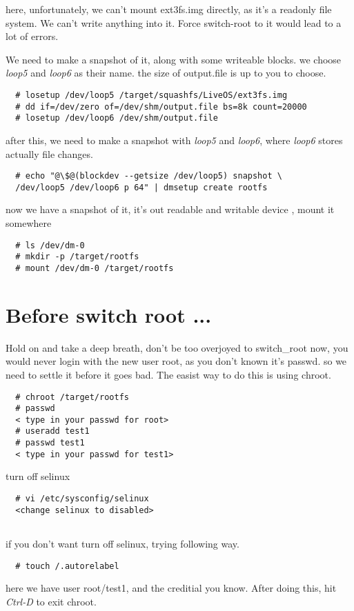 here, unfortunately, we can't mount ext3fs.img directly, as it's a readonly file system. We can't write anything into it. Force switch-root to it would lead to a lot of errors.

We need to make a snapshot of it, along with some writeable blocks. we choose \emph{loop5} and \emph{loop6} as their name. the size of output.file is up to you to choose.
\begin{lstlisting}
  # losetup /dev/loop5 /target/squashfs/LiveOS/ext3fs.img
  # dd if=/dev/zero of=/dev/shm/output.file bs=8k count=20000 
  # losetup /dev/loop6 /dev/shm/output.file
\end{lstlisting}

after this, we need to make a snapshot with \emph{loop5} and \emph{loop6}, where \emph{loop6} stores actually file changes.

\begin{lstlisting}
  # echo "@\$@(blockdev --getsize /dev/loop5) snapshot \
  /dev/loop5 /dev/loop6 p 64" | dmsetup create rootfs
\end{lstlisting}

now we have a snapshot of it, it's out readable and writable device , mount it somewhere
\begin{lstlisting}
  # ls /dev/dm-0
  # mkdir -p /target/rootfs
  # mount /dev/dm-0 /target/rootfs
\end{lstlisting}


  
\section{Before switch root ...}
Hold on and take a deep breath, don't be too overjoyed to switch\_root now, you would never login with the new user root, as you don't known it's passwd.
so we need to settle it before it goes bad. The easist way to do this is using chroot. 
\begin{lstlisting}
  # chroot /target/rootfs
  # passwd
  < type in your passwd for root>
  # useradd test1
  # passwd test1
  < type in your passwd for test1>
\end{lstlisting}

turn off selinux

\begin{lstlisting}
  # vi /etc/sysconfig/selinux  
  <change selinux to disabled>
  
\end{lstlisting}

if you don't want turn off selinux, trying following way.
\begin{lstlisting}
  # touch /.autorelabel
\end{lstlisting}
here we have user root/test1, and the creditial you know. After doing this, hit \emph{Ctrl-D} to exit chroot. 


